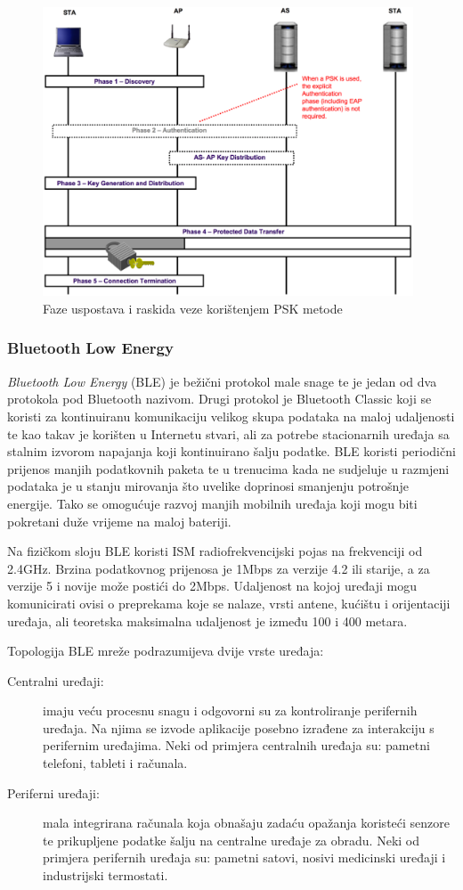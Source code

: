 \documentclass[times, utf8, diplomski]{fer}
\begin{document}
\begin{figure}[H]
    \centering
    \includegraphics[width=11cm]{images/psk.png}
    \caption{Faze uspostava i raskida veze korištenjem PSK metode\citep{NIST}}
    \label{fig:psk}
\end{figure}

\subsubsection{Bluetooth Low Energy}
\emph{Bluetooth Low Energy} (BLE)\citep{Bluetooth} je bežični protokol male snage te je jedan od dva protokola pod Bluetooth nazivom. Drugi protokol je Bluetooth Classic koji se koristi za kontinuiranu komunikaciju velikog skupa podataka na maloj udaljenosti te kao takav je korišten u Internetu stvari, ali za potrebe stacionarnih uređaja sa stalnim izvorom napajanja koji kontinuirano šalju podatke. BLE koristi periodični prijenos manjih podatkovnih paketa te u trenucima kada ne sudjeluje u razmjeni podataka je u stanju mirovanja što uvelike doprinosi smanjenju potrošnje energije. Tako se omogućuje razvoj manjih mobilnih uređaja koji mogu biti pokretani duže vrijeme na maloj bateriji. 

Na fizičkom sloju BLE koristi ISM  radiofrekvencijski pojas na frekvenciji od 2.4GHz. Brzina podatkovnog prijenosa je 1Mbps za verzije 4.2 ili starije, a za verzije 5 i novije može postići do 2Mbps. Udaljenost na kojoj uređaji mogu komunicirati ovisi o preprekama koje se nalaze, vrsti antene, kućištu i orijentaciji uređaja, ali teoretska maksimalna udaljenost je između 100 i 400 metara.

Topologija BLE mreže podrazumijeva dvije vrste uređaja:
\begin{description}
    \item[Centralni uređaji:]imaju veću procesnu snagu i odgovorni su za kontroliranje perifernih uređaja. Na njima se izvode aplikacije posebno izrađene za interakciju s perifernim uređajima. Neki od primjera centralnih uređaja su: pametni telefoni, tableti i računala. 
    \item[Periferni uređaji:]mala integrirana računala koja obnašaju zadaću opažanja koristeći senzore te prikupljene podatke šalju na centralne uređaje za obradu. Neki od primjera perifernih uređaja su: pametni satovi, nosivi medicinski uređaji i industrijski termostati.
\end{description}
\end{document}
